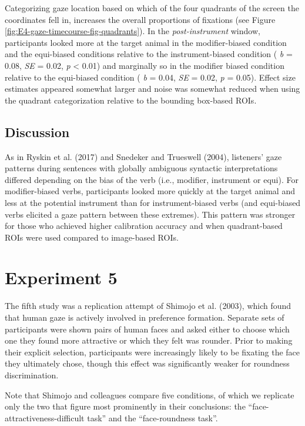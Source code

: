 \documentclass[
  man,floatsintext]{apa6}
\begin{document}
Categorizing gaze location based on which of the four quadrants of the screen the coordinates fell in, increases the overall proportions of fixations (see Figure \ref{fig:E4-gaze-timecourse-fig-quadrants}). In the \emph{post-instrument} window, participants looked more at the target animal in the modifier-biased condition and the equi-biased conditions relative to the instrument-biased condition ( \emph{b} = 0.08, \emph{SE} = 0.02, \emph{p} \textless{} 0.01) and marginally so in the modifier biased condition relative to the equi-biased condition ( \emph{b} = 0.04, \emph{SE} = 0.02, \emph{p} = 0.05). Effect size estimates appeared somewhat larger and noise was somewhat reduced when using the quadrant categorization relative to the bounding box-based ROIs.

\hypertarget{discussion-3}{%
\subsection{Discussion}\label{discussion-3}}

As in Ryskin et al. (2017) and Snedeker and Trueswell (2004), listeners' gaze patterns during sentences with globally ambiguous syntactic interpretations differed depending on the bias of the verb (i.e., modifier, instrument or equi). For modifier-biased verbs, participants looked more quickly at the target animal and less at the potential instrument than for instrument-biased verbs (and equi-biased verbs elicited a gaze pattern between these extremes). This pattern was stronger for those who achieved higher calibration accuracy and when quadrant-based ROIs were used compared to image-based ROIs.

\hypertarget{experiment-5}{%
\section{Experiment 5}\label{experiment-5}}

The fifth study was a replication attempt of Shimojo et al. (2003),
which found that human gaze is actively involved in preference
formation. Separate sets of participants were shown pairs of human faces
and asked either to choose which one they found more attractive or which
they felt was rounder. Prior to making their explicit selection,
participants were increasingly likely to be fixating the face they
ultimately chose, though this effect was significantly weaker for
roundness discrimination.

Note that Shimojo and colleagues compare five conditions, of which we
replicate only the two that figure most prominently in their
conclusions: the ``face-attractiveness-difficult task'' and the
``face-roundness task''.
\end{document}
